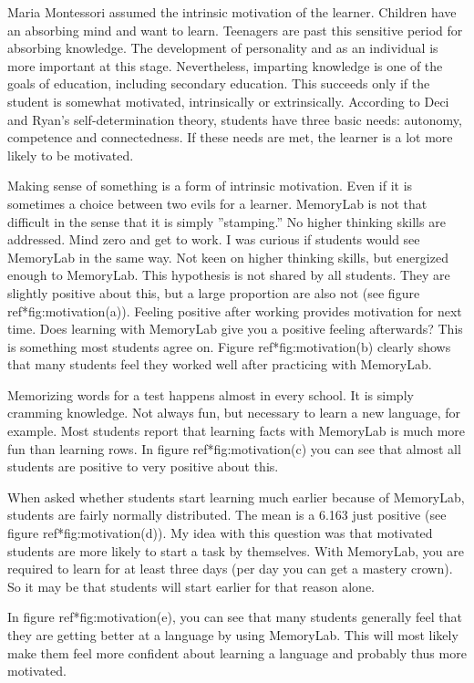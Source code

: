 \documentclass[12pt, a4paper]{article}
\begin{document}
{{Maria Montessori assumed the intrinsic motivation of the learner. Children have an absorbing mind and want to learn. Teenagers are past this sensitive period for absorbing knowledge. The development of personality and as an individual is more important at this stage. Nevertheless, imparting knowledge is one of the goals of education, including secondary education. This succeeds only if the student is somewhat motivated, intrinsically or extrinsically. According to Deci and Ryan's self-determination theory, students have three basic needs: autonomy, competence and connectedness. If these needs are met, the learner is a lot more likely to be motivated.

Making sense of something is a form of intrinsic motivation. Even if it is sometimes a choice between two evils for a learner. MemoryLab is not that difficult in the sense that it is simply ''stamping.'' No higher thinking skills are addressed. Mind zero and get to work. I was curious if students would see MemoryLab in the same way. Not keen on higher thinking skills, but energized enough to MemoryLab. This hypothesis is not shared by all students. They are slightly positive about this, but a large proportion are also not (see figure ref*{fig:motivation}(a)).
Feeling positive after working provides motivation for next time. Does learning with MemoryLab give you a positive feeling afterwards? This is something most students agree on. Figure ref*{fig:motivation}(b) clearly shows that many students feel they worked well after practicing with MemoryLab.

Memorizing words for a test happens almost in every school. It is simply cramming knowledge. Not always fun, but necessary to learn a new language, for example. Most students report that learning facts with MemoryLab is much more fun than learning rows. In figure ref*{fig:motivation}(c) you can see that almost all students are positive to very positive about this.

When asked whether students start learning much earlier because of MemoryLab, students are fairly normally distributed. The mean is a 6.163 just positive (see figure ref*{fig:motivation}(d)). My idea with this question was that motivated students are more likely to start a task by themselves. With MemoryLab, you are required to learn for at least three days (per day you can get a mastery crown). So it may be that students will start earlier for that reason alone.

In figure ref*{fig:motivation}(e), you can see that many students generally feel that they are getting better at a language by using MemoryLab. This will most likely make them feel more confident about learning a language and probably thus more motivated.

}}
\end{document}
